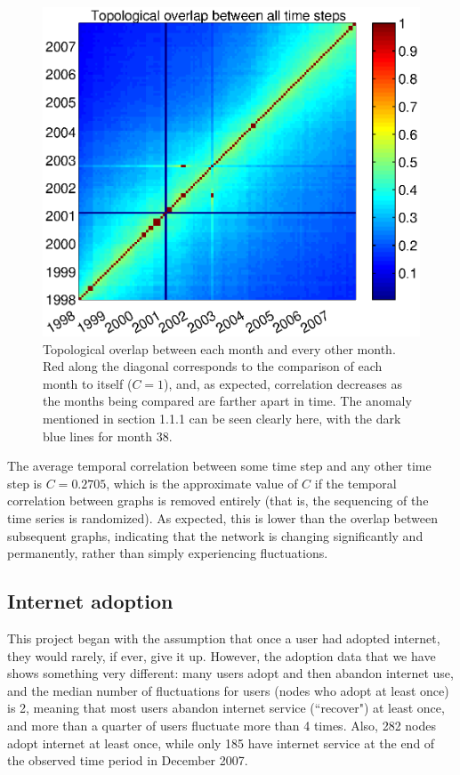 \documentclass[12pt]{article}
\begin{document}
\begin{figure}[H]
\includegraphics[trim=4.5cm 4cm 3.1cm 0.7cm, clip=true, width = .95\textwidth]{Graficos/overlap.eps}
\caption{Topological overlap between each month and every other month. Red along the diagonal corresponds to the comparison of each month to itself (\(C = 1\)), and, as expected, correlation decreases as the months being compared are farther apart in time. The anomaly mentioned in section 1.1.1 can be seen clearly here, with the dark blue lines for month 38.}
\label{fig:overlap}
\end{figure}

The average temporal correlation between some time step and any other time step is \(C = 0.2705\), which is the approximate value of \(C\) if the temporal correlation between graphs is removed entirely (that is, the sequencing of the time series is randomized). As expected, this is lower than the overlap between subsequent graphs, indicating that the network is changing significantly and permanently, rather than simply experiencing fluctuations.

\subsection{Internet adoption}

This project began with the assumption that once a user had adopted internet, they would rarely, if ever, give it up. However, the adoption data that we have shows something very different: many users adopt and then abandon internet use, and the median number of fluctuations for users (nodes who adopt at least once) is 2, meaning that most users abandon internet service (``recover") at least once, and more than a quarter of users fluctuate more than 4 times. Also, 282 nodes adopt internet at least once, while only 185 have internet service at the end of the observed time period in December 2007.
\end{document}
